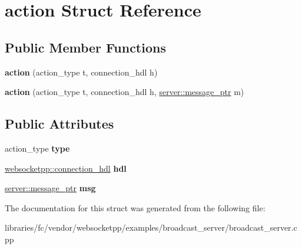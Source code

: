 \hypertarget{structaction}{}\section{action Struct Reference}
\label{structaction}
\subsection*{Public Member Functions}
\begin{DoxyCompactItemize}
\item 
\mbox{\label{structaction_a0be087fbf9a58c69c490951f1b8ea505}} 
{\bfseries action} (action\+\_\+type t, connection\+\_\+hdl h)
\item 
\mbox{\label{structaction_ab8933d631653c7fbaa805af13f72b7fb}} 
{\bfseries action} (action\+\_\+type t, connection\+\_\+hdl h, \mbox{\hyperlink{classwebsocketpp_1_1endpoint_a585ecbbfd9689d4e4229e4c8378bd672}{server\+::message\+\_\+ptr}} m)
\end{DoxyCompactItemize}
\subsection*{Public Attributes}
\begin{DoxyCompactItemize}
\item 
\mbox{\label{structaction_aa154ad821e11c996d14c118e4cba0fb4}} 
action\+\_\+type {\bfseries type}
\item 
\mbox{\label{structaction_a77650a81e0754605034920b760c68054}} 
\mbox{\hyperlink{namespacewebsocketpp_a6b3d26a10ee7229b84b776786332631d}{websocketpp\+::connection\+\_\+hdl}} {\bfseries hdl}
\item 
\mbox{\label{structaction_af08c66137b09d708c0e573273fde5ee9}} 
\mbox{\hyperlink{classwebsocketpp_1_1endpoint_a585ecbbfd9689d4e4229e4c8378bd672}{server\+::message\+\_\+ptr}} {\bfseries msg}
\end{DoxyCompactItemize}


The documentation for this struct was generated from the following file\+:\begin{DoxyCompactItemize}
\item 
libraries/fc/vendor/websocketpp/examples/broadcast\+\_\+server/broadcast\+\_\+server.\+cpp\end{DoxyCompactItemize}
